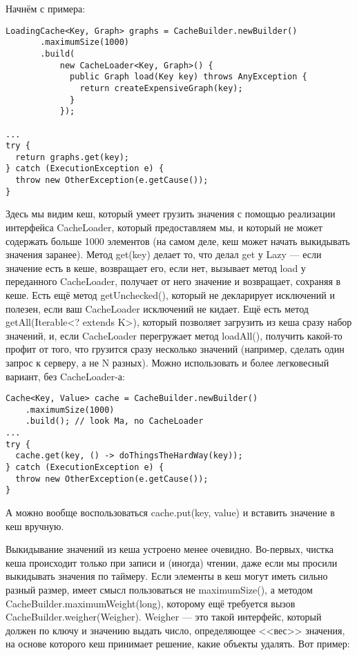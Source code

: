 \documentclass[a5paper,draft]{article}
\begin{document}
Начнём с примера:
\begin{verbatim}
LoadingCache<Key, Graph> graphs = CacheBuilder.newBuilder()
       .maximumSize(1000)
       .build(
           new CacheLoader<Key, Graph>() {
             public Graph load(Key key) throws AnyException {
               return createExpensiveGraph(key);
             }
           });

...
try {
  return graphs.get(key);
} catch (ExecutionException e) {
  throw new OtherException(e.getCause());
}
\end{verbatim}

Здесь мы видим кеш, который умеет грузить значения с помощью реализации интерфейса CacheLoader, который предоставляем мы, и который не может содержать больше 1000 элементов (на самом деле, кеш может начать выкидывать значения заранее). Метод get(key) делает то, что делал get у Lazy --- если значение есть в кеше, возвращает его, если нет, вызывает метод load у переданного CacheLoader, получает от него значение и возвращает, сохраняя в кеше. Есть ещё метод getUnchecked(), который не декларирует исключений и полезен, если ваш CacheLoader исключений не кидает. Ещё есть метод getAll(Iterable<? extends K>), который позволяет загрузить из кеша сразу набор значений, и, если CacheLoader перегружает метод loadAll(), получить какой-то профит от того, что грузится сразу несколько значений (например, сделать один запрос к серверу, а не N разных). Можно использовать и более легковесный вариант, без CacheLoader-а:

\begin{verbatim}
Cache<Key, Value> cache = CacheBuilder.newBuilder()
    .maximumSize(1000)
    .build(); // look Ma, no CacheLoader
...
try {
  cache.get(key, () -> doThingsTheHardWay(key));
} catch (ExecutionException e) {
  throw new OtherException(e.getCause());
}
\end{verbatim}

А можно вообще воспользоваться cache.put(key, value) и вставить значение в кеш вручную.

Выкидывание значений из кеша устроено менее очевидно. Во-первых, чистка кеша происходит только при записи и (иногда) чтении, даже если мы просили выкидывать значения по таймеру. Если элементы в кеш могут иметь сильно разный размер, имеет смысл пользоваться не maximumSize(), а методом CacheBuilder.maximumWeight(long), которому ещё требуется вызов CacheBuilder.weigher(Weigher). Weigher --- это такой интерфейс, который должен по ключу и значению выдать число, определяющее <<вес>> значения, на основе которого кеш принимает решение, какие объекты удалять. Вот пример:
\end{document}
